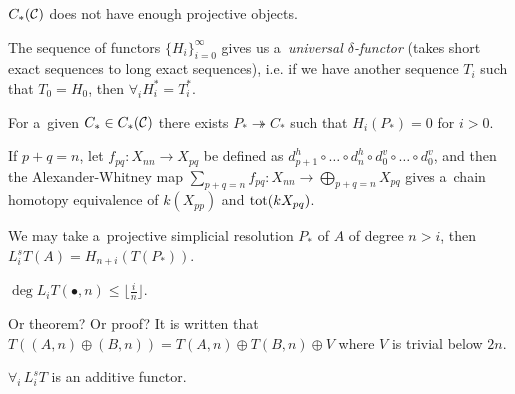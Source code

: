 



    \begin{remark}
        $C_\ast(\mathcal{C})$ does not have enough projective objects.
    \end{remark}
    
    \begin{theorem}
        The sequence of functors $\{ H_i\}_{i=0}^\infty$
        gives us a~{\em universal $\delta$-functor}
        (takes short exact sequences to long exact sequences),
        i.e. if we have another sequence $T_i$ such that
        $T_0 = H_0$, then $\forall_i H_i^\ast= T_i^\ast$.
    \end{theorem}
    
    \begin{lemma}
        For a~given $C_\ast \in C_\ast(\mathcal{C})$ there exists 
        $P_\ast \twoheadrightarrow C_\ast$
        such that $H_i(P_\ast) = 0$ for $i>0$.
    \end{lemma}
    
    \begin{remark}
        If $p+q=n$,
        let $f_{pq}:X_{nn}\to X_{pq}$ be
        defined as $d_{p+1}^h \circ \ldots \circ d_n^h
        \circ d_0^v \circ \ldots \circ d_0^v$,
        and then the Alexander-Whitney map
        $\sum_{p+q = n}f_{pq}:X_{nn} \to \bigoplus_{p+q=n}X_{pq}$
        gives a~chain homotopy equivalence 
        of $k(X_{pp})$ and ${\mathrm{tot}}(kX_{pq})$.
    \end{remark}
    
    \begin{remark}
        We may take a~projective simplicial resolution $P_\ast$ of $A$
        of degree $n>i$,
        then $L_i^s T(A) = H_{n+i}(T(P_\ast))$.
    \end{remark}
    
    \begin{theorem}
        $\deg L_i T(\bullet, n) \leq \lfloor \frac i n \rfloor$.
    \end{theorem}
    
    \begin{remark}
        Or theorem? Or proof?
        It is written that $T((A,n)\oplus(B,n)) = T(A,n) \oplus T(B,n) \oplus V$
        where $V$ is trivial below $2n$.
    \end{remark}
    
    \begin{proposition}
        $\forall_i \, L_i^sT$ is an additive functor.
    \end{proposition}
    
